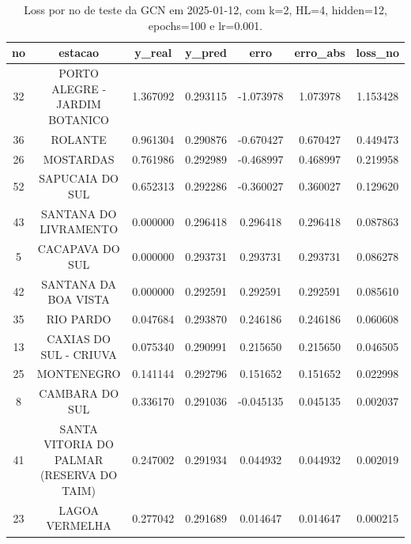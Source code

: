 \begin{table}[h]
\centering
\caption{Loss por no de teste da GCN em 2025-01-12, com k=2, HL=4, hidden=12, epochs=100 e lr=0.001.}
\label{tab:gcn_loss_k2_hl4_h12_e100_d20250112}
\begin{tabular}{ccccccc}
\toprule
no & estacao & y\_real & y\_pred & erro & erro\_abs & loss\_no \\
\midrule
32 & PORTO ALEGRE - JARDIM BOTANICO & 1.367092 & 0.293115 & -1.073978 & 1.073978 & 1.153428 \\
36 & ROLANTE & 0.961304 & 0.290876 & -0.670427 & 0.670427 & 0.449473 \\
26 & MOSTARDAS & 0.761986 & 0.292989 & -0.468997 & 0.468997 & 0.219958 \\
52 & SAPUCAIA DO SUL & 0.652313 & 0.292286 & -0.360027 & 0.360027 & 0.129620 \\
43 & SANTANA DO LIVRAMENTO & 0.000000 & 0.296418 & 0.296418 & 0.296418 & 0.087863 \\
5 & CACAPAVA DO SUL & 0.000000 & 0.293731 & 0.293731 & 0.293731 & 0.086278 \\
42 & SANTANA DA BOA VISTA & 0.000000 & 0.292591 & 0.292591 & 0.292591 & 0.085610 \\
35 & RIO PARDO & 0.047684 & 0.293870 & 0.246186 & 0.246186 & 0.060608 \\
13 & CAXIAS DO SUL - CRIUVA & 0.075340 & 0.290991 & 0.215650 & 0.215650 & 0.046505 \\
25 & MONTENEGRO & 0.141144 & 0.292796 & 0.151652 & 0.151652 & 0.022998 \\
8 & CAMBARA DO SUL & 0.336170 & 0.291036 & -0.045135 & 0.045135 & 0.002037 \\
41 & SANTA VITORIA DO PALMAR (RESERVA DO TAIM) & 0.247002 & 0.291934 & 0.044932 & 0.044932 & 0.002019 \\
23 & LAGOA VERMELHA & 0.277042 & 0.291689 & 0.014647 & 0.014647 & 0.000215 \\
\bottomrule
\end{tabular}
\end{table}
